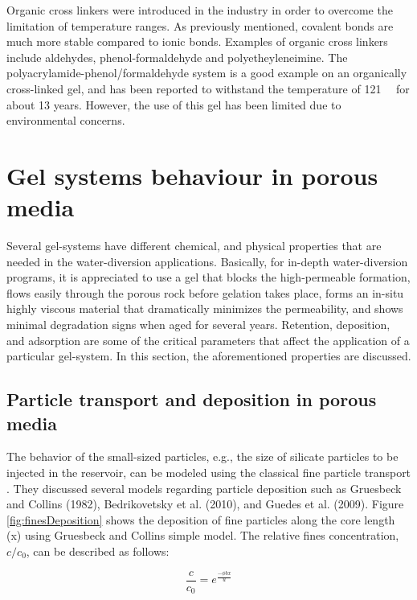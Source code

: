 Organic cross linkers were introduced in the industry in order to overcome the limitation of temperature ranges\citep{Al-Muntasheri2005}. As previously mentioned, covalent bonds are much more stable compared to ionic bonds. Examples of organic cross linkers include aldehydes, phenol-formaldehyde and polyetheyleneimine. The polyacrylamide-phenol/formaldehyde system is a good example on an organically cross-linked gel, and has been reported to withstand the temperature of 121~\celsius~ for about 13 years. However, the use of this gel has been limited due to environmental concerns.

\section{Gel systems behaviour in porous media}

Several gel-systems have different chemical, and physical properties that are needed in the water-diversion applications. Basically, for in-depth water-diversion programs, it is appreciated to use a gel that blocks the high-permeable formation, flows easily through the porous rock before gelation takes place, forms an in-situ highly viscous material that dramatically minimizes the permeability, and shows minimal degradation signs when aged for several years. Retention, deposition, and adsorption are some of the critical parameters that affect the application of a particular gel-system. In this section, the aforementioned properties are discussed.

\subsection{Particle transport and deposition in porous media}  The behavior of the small-sized particles, e.g., the size of silicate particles to be injected in the reservoir, can be modeled using the classical fine particle transport \citep{Stavland2011}. They discussed several models regarding particle deposition such as Gruesbeck and Collins (1982), Bedrikovetsky et al. (2010), and Guedes et al. (2009). Figure \ref{fig:finesDeposition} shows the deposition of fine particles along the core length (x) using Gruesbeck and Collins simple model. The relative fines concentration, $c/c_0$, can be described as follows:

\begin{equation}
    \frac{c}{c_0} = e^{\frac{-\phi bx}{u}}
\end{equation}

